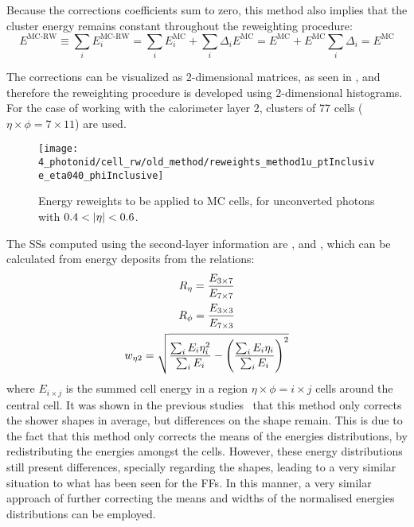 Because the corrections coefficients sum to zero, this method also implies that the cluster energy remains constant throughout the reweighting procedure:
\begin{equation*}
    E^{\text{MC-RW}} \equiv \sum_i E_i^{\text{MC-RW}}
    = \sum_i E_i^{\text{MC}} + \sum_i \Delta_i E^{\text{MC}} = E^{\text{MC}} + E^{\text{MC}} \sum_i \Delta_i = E^{\text{MC}}
\end{equation*}

The corrections can be visualized as 2-dimensional matrices, as seen in \Fig{\ref{fig:ss_corrections:cell_rw:calculation:previous:reweights}}, and therefore the reweighting procedure is developed using 2-dimensional histograms. For the case of working with the calorimeter layer 2, clusters of 77 cells (\(\eta\times\phi=7\times11\)) are used.

\begin{figure}[htbp]
    \centering
    \texttt{[image: 4\_photonid/cell\_rw/old\_method/reweights\_method1u\_ptInclusive\_eta040\_phiInclusive]}
    \caption{Energy reweights to be applied to \ac{MC} cells, for unconverted photons with \(0.4<\abseta<0.6\). }
    \label{fig:ss_corrections:cell_rw:calculation:previous:reweights}
\end{figure}

The \acp{SS} computed using the second-layer information are \reta, \rphi and \weta, which can be calculated from energy deposits from the relations:
\begin{gather*}
    R_{\eta} = \frac{E_{3\times 7}}{E_{7\times 7}}\\
    R_{\phi} = \frac{E_{3\times 3}}{E_{7\times 3}}\\
    w_{\eta 2} = \sqrt{\frac{\sum_i E_i \eta^2_i}{\sum_i E_i} - \left( \frac{\sum_i E_i \eta_i}{\sum_i E_i} \right)^2}
\end{gather*}
where \(E_{i\times j}\) is the summed cell energy in a region \(\eta\times\phi=i\times j\) cells around the central cell. It was shown in the previous studies~\cite{thesis_belfkir} that this method only corrects the shower shapes in average, but differences on the shape remain. This is due to the fact that this method only corrects the means of the energies distributions, by redistributing the energies amongst the cells. However, these energy distributions still present differences, specially regarding the shapes, leading to a very similar situation to what has been seen for the \acp{FF}. In this manner, a very similar approach of further correcting the means and widths of the normalised energies distributions can be employed.


